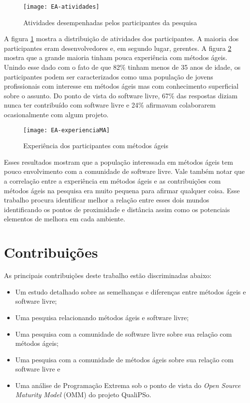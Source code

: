 \begin{figure}[htb]
  \centerline{
    \texttt{[image: EA-atividades]}
  }
  \caption{Atividades desempenhadas pelos participantes da pesquisa}
  \label{fig:EA-atividades}
\end{figure}

A figura \ref{fig:EA-atividades} mostra a distribuição de atividades
dos participantes. A maioria dos participantes eram desenvolvedores e,
em segundo lugar, gerentes. A figura \ref{fig:EA-experienciaMA} mostra
que a grande maioria tinham pouca experiência com métodos
ágeis. Unindo esse dado com o fato de que 82\% tinham menos de 35 anos
de idade, os participantes podem ser caracterizados como uma população
de jovens profissionais com interesse em métodos ágeis mas com
conhecimento superficial sobre o assunto. Do ponto de vista do
software livre, 67\% das respostas diziam nunca ter contribuído com
software livre e 24\% afirmavam colaborarem ocasionalmente com algum
projeto.

\begin{figure}[htb]
  \centerline{
    \texttt{[image: EA-experienciaMA]}
  }
  \caption{Experiência dos participantes com métodos ágeis}
  \label{fig:EA-experienciaMA}
\end{figure}

Esses resultados mostram que a população interessada em métodos ágeis
tem pouco envolvimento com a comunidade de software livre. Vale também
notar que a correlação entre a experiência em métodos ágeis e as
contribuições com métodos ágeis na pesquisa era muito pequena para
afirmar qualquer coisa. Esse trabalho procura identificar melhor a
relação entre esses dois mundos identificando os pontos de proximidade
e distância assim como os potenciais elementos de melhora em cada
ambiente.

\section{Contribuições}
\label{sec:contribucoes}

As principais contribuições deste trabalho estão discriminadas abaixo:

\begin{itemize}
\item Um estudo detalhado sobre as semelhanças e diferenças entre
  métodos ágeis e software livre;
\item Uma pesquisa relacionando métodos ágeis e software livre;
\item Uma pesquisa com a comunidade de software livre sobre sua
  relação com métodos ágeis;
\item Uma pesquisa com a comunidade de métodos ágeis sobre sua relação
  com software livre e
\item Uma análise de Programação Extrema sob o ponto de vista do
  \emph{Open Source Maturity Model} (OMM) do projeto QualiPSo.
\end{itemize}

